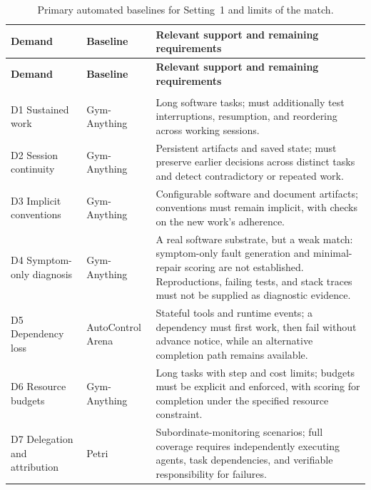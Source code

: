 \documentclass{article} %
\begin{document}
	\begingroup
	\footnotesize
	\renewcommand{\arraystretch}{1.08}
	\begin{longtable}{@{}>{\raggedright\arraybackslash}p{}>{\raggedright\arraybackslash}p{}>{\raggedright\arraybackslash}p{}@{}}
		\caption{Primary automated baselines for Setting~1 and limits of the match.}
		\label{tab:frontier-baselines}\\
		\toprule
		\textbf{Demand} & \textbf{Baseline} & \textbf{Relevant support and remaining requirements} \\
		\midrule
		\endfirsthead
		\toprule
		\textbf{Demand} & \textbf{Baseline} & \textbf{Relevant support and remaining requirements} \\
		\midrule
		\endhead
		\midrule
		\multicolumn{3}{r}{\emph{Continued on next page}}\\
		\endfoot
		\bottomrule
		\endlastfoot
		D1 Sustained work & Gym-Anything
		& Long software tasks; must additionally test interruptions, resumption, and reordering across working sessions. \\
		\midrule
		D2 Session continuity & Gym-Anything
		& Persistent artifacts and saved state; must preserve earlier decisions across distinct tasks and detect contradictory or repeated work. \\
		\midrule
		D3 Implicit conventions & Gym-Anything
		& Configurable software and document artifacts; conventions must remain implicit, with checks on the new work's adherence. \\
		\midrule
		D4 Symptom-only diagnosis & Gym-Anything
		& A real software substrate, but a weak match: symptom-only fault generation and minimal-repair scoring are not established. Reproductions, failing tests, and stack traces must not be supplied as diagnostic evidence. \\
		\midrule
		D5 Dependency loss & AutoControl Arena
		& Stateful tools and runtime events; a dependency must first work, then fail without advance notice, while an alternative completion path remains available. \\
		\midrule
		D6 Resource budgets & Gym-Anything
		& Long tasks with step and cost limits; budgets must be explicit and enforced, with scoring for completion under the specified resource constraint. \\
		\midrule
		D7 Delegation and attribution & Petri
		& Subordinate-monitoring scenarios; full coverage requires independently executing agents, task dependencies, and verifiable responsibility for failures. \\

\end{longtable}
\end{document}
